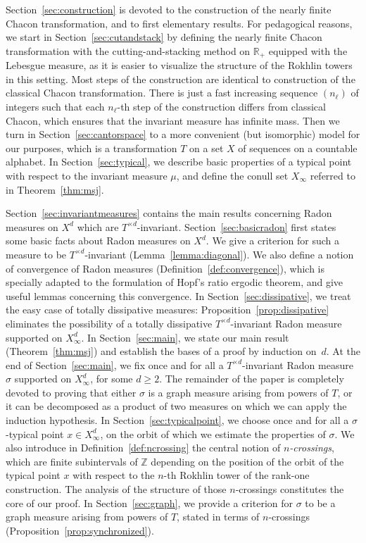 \documentclass[AHL,Unicode,longabstracts]{cedram}
\newcommand{\ZZ}{\mathbb{Z}}
\newcommand{\RR}{\mathbb{R}}
\newcommand{\td}{T^{\times d}}
\begin{document}
Section~\ref{sec:construction} is devoted to the construction of the nearly finite Chacon transformation, and to first elementary results. For pedagogical reasons, we start in Section~\ref{sec:cutandstack} by defining the nearly finite Chacon transformation with the cutting-and-stacking method on $ \RR_+$ equipped with the Lebesgue measure, as it is easier to visualize the structure of the Rokhlin towers in this setting. Most steps of the construction are identical to construction of the classical Chacon transformation. There is just a fast increasing sequence $(n_\ell)$ of integers such that each $n_\ell$-th step of the construction differs from classical Chacon, which ensures that the invariant measure has infinite mass. Then we turn in Section~\ref{sec:cantorspace} to a more convenient (but isomorphic) model for our purposes, which is a transformation $T$ on a set $X$ of sequences on a countable alphabet. In Section~\ref{sec:typical}, we describe basic properties of a typical point with respect to the invariant measure $\mu$, and define the conull set $X_\infty$ referred to in Theorem~\ref{thm:msj}.

Section~\ref{sec:invariantmeasures} contains the main results concerning Radon measures on $X^d$ which are $\td$-invariant. Section~\ref{sec:basicradon} first states some basic facts about Radon measures on $X^d$. We give a criterion for such a measure to be $\td$-invariant (Lemma~\ref{lemma:diagonal}). We also define a notion of convergence of Radon measures (Definition~\ref{def:convergence}), which is specially adapted to the formulation of Hopf's ratio ergodic theorem, and give useful lemmas concerning this convergence. In Section~\ref{sec:dissipative}, we treat the easy case of totally dissipative measures: Proposition~\ref{prop:dissipative} eliminates the possibility of a totally dissipative $\td$-invariant Radon measure supported on $X_\infty^d$. In Section~\ref{sec:main}, we state our main result (Theorem~\ref{thm:msj}) and establish the bases of a proof by induction on~$d$. At the end of Section~\ref{sec:main}, we fix once and for all a $\td$-invariant Radon measure $\sigma$ supported on $X_\infty^d$, for some $d\ge2$. The remainder of the paper is completely devoted to proving that either $\sigma$ is a graph measure arising from powers of $T$, or it can be decomposed as a product of two measures on which we can apply the induction hypothesis. In Section~\ref{sec:typicalpoint}, we choose once and for all a $\sigma$-typical point $x\in X_\infty^d$, on the orbit of which we estimate the properties of $\sigma$. We also introduce in Definition~\ref{def:ncrossing} the central notion of \emph{$n$-crossings}, which are finite subintervals of $\ZZ$ depending on the position of the orbit of the typical point $x$ with respect to the $n$-th Rokhlin tower of the rank-one construction. The analysis of the structure of those $n$-crossings constitutes the core of our proof. In Section~\ref{sec:graph}, we provide a criterion for $\sigma$ to be a graph measure arising from powers of $T$, stated in terms of $n$-crossings (Proposition~\ref{prop:synchronized}).
\end{document}
